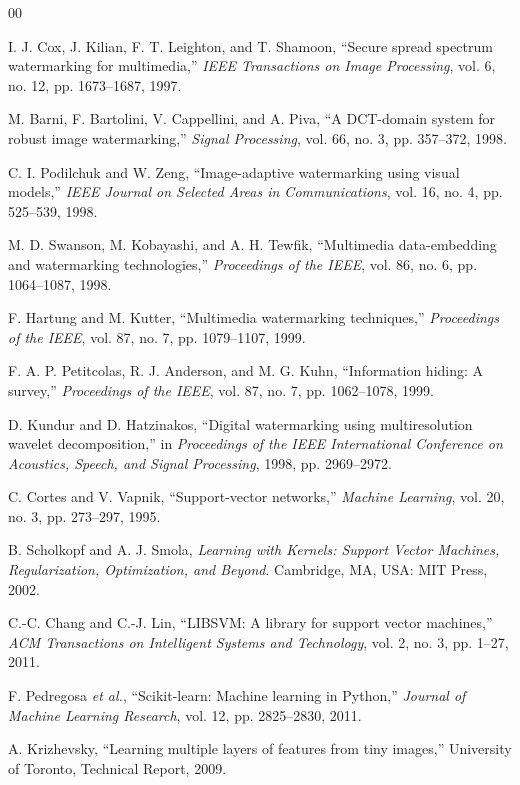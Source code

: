 \documentclass[conference]{IEEEtran}
\begin{document}
\begin{thebibliography}{00}

I. J. Cox, J. Kilian, F. T. Leighton, and T. Shamoon, ``Secure spread spectrum watermarking for multimedia,'' \textit{IEEE Transactions on Image Processing}, vol. 6, no. 12, pp. 1673--1687, 1997.

M. Barni, F. Bartolini, V. Cappellini, and A. Piva, ``A DCT-domain system for robust image watermarking,'' \textit{Signal Processing}, vol. 66, no. 3, pp. 357--372, 1998.

C. I. Podilchuk and W. Zeng, ``Image-adaptive watermarking using visual models,'' \textit{IEEE Journal on Selected Areas in Communications}, vol. 16, no. 4, pp. 525--539, 1998.

M. D. Swanson, M. Kobayashi, and A. H. Tewfik, ``Multimedia data-embedding and watermarking technologies,'' \textit{Proceedings of the IEEE}, vol. 86, no. 6, pp. 1064--1087, 1998.

F. Hartung and M. Kutter, ``Multimedia watermarking techniques,'' \textit{Proceedings of the IEEE}, vol. 87, no. 7, pp. 1079--1107, 1999.

F. A. P. Petitcolas, R. J. Anderson, and M. G. Kuhn, ``Information hiding: A survey,'' \textit{Proceedings of the IEEE}, vol. 87, no. 7, pp. 1062--1078, 1999.

D. Kundur and D. Hatzinakos, ``Digital watermarking using multiresolution wavelet decomposition,'' in \textit{Proceedings of the IEEE International Conference on Acoustics, Speech, and Signal Processing}, 1998, pp. 2969--2972.

C. Cortes and V. Vapnik, ``Support-vector networks,'' \textit{Machine Learning}, vol. 20, no. 3, pp. 273--297, 1995.

B. Scholkopf and A. J. Smola, \textit{Learning with Kernels: Support Vector Machines, Regularization, Optimization, and Beyond}. Cambridge, MA, USA: MIT Press, 2002.

C.-C. Chang and C.-J. Lin, ``LIBSVM: A library for support vector machines,'' \textit{ACM Transactions on Intelligent Systems and Technology}, vol. 2, no. 3, pp. 1--27, 2011.

F. Pedregosa \textit{et al.}, ``Scikit-learn: Machine learning in Python,'' \textit{Journal of Machine Learning Research}, vol. 12, pp. 2825--2830, 2011.

A. Krizhevsky, ``Learning multiple layers of features from tiny images,'' University of Toronto, Technical Report, 2009.

\end{thebibliography}
\end{document}
